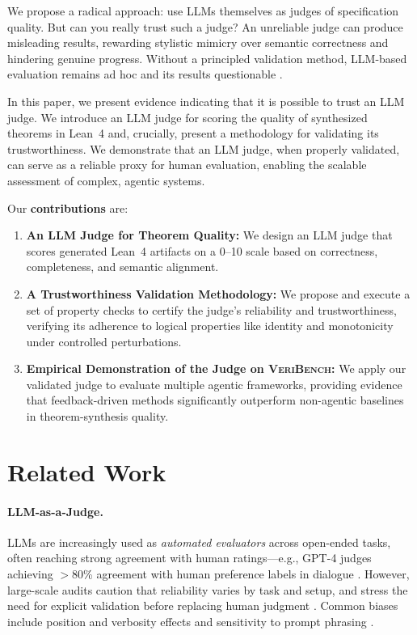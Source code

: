 \documentclass{article}
\begin{document}
We propose a radical approach: use LLMs themselves as judges of specification quality. But can you really trust such a judge? An unreliable judge can produce misleading results, rewarding stylistic mimicry over semantic correctness and hindering genuine progress. Without a principled validation method, LLM-based evaluation remains ad hoc and its results questionable \citep{Kocmi2024HumanVsLLM,Li2024TrustLLMJudgments}.

In this paper, we present evidence indicating that it is possible to trust an LLM judge. We introduce an LLM judge for scoring the quality of synthesized theorems in Lean~4 and, crucially, present a methodology for validating its trustworthiness. We demonstrate that an LLM judge, when properly validated, can serve as a reliable proxy for human evaluation, enabling the scalable assessment of complex, agentic systems.

Our \textbf{contributions} are:
\begin{enumerate}
    \item \textbf{An LLM Judge for Theorem Quality:} We design an LLM judge that scores generated Lean~4 artifacts on a 0--10 scale based on correctness, completeness, and semantic alignment.
    \item \textbf{A Trustworthiness Validation Methodology:} We propose and execute a set of property checks to certify the judge's reliability and trustworthiness, verifying its adherence to logical properties like identity and monotonicity under controlled perturbations.
    \item \textbf{Empirical Demonstration of the Judge on \textsc{VeriBench}:} We apply our validated judge to evaluate multiple agentic frameworks, providing evidence that feedback-driven methods significantly outperform non-agentic baselines in theorem-synthesis quality.
\end{enumerate}

\section{Related Work}
\paragraph{LLM-as-a-Judge.}
LLMs are increasingly used as \emph{automated evaluators} across open-ended tasks, often reaching strong agreement with human ratings---e.g., GPT-4 judges achieving $>$80\% agreement with human preference labels in dialogue \citep{Zheng2023MTBench}. However, large-scale audits caution that reliability varies by task and setup, and stress the need for explicit validation before replacing human judgment \citep{Kocmi2024HumanVsLLM,Li2024TrustLLMJudgments}. Common biases include position and verbosity effects and sensitivity to prompt phrasing \citep{Zheng2023MTBench,Li2024TrustLLMJudgments}.
\end{document}
